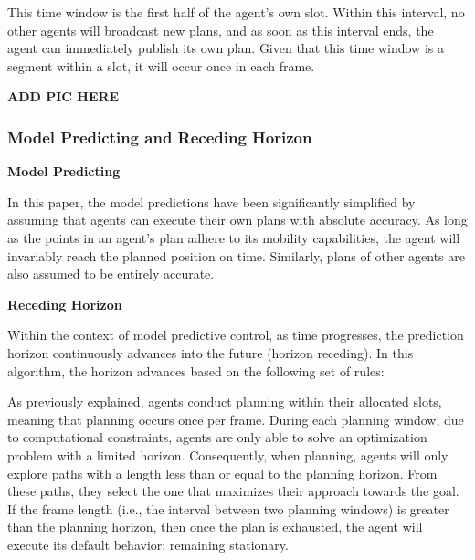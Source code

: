 This time window is the first half of the agent's own slot. Within this interval, no other agents will broadcast new plans, and as soon as this interval ends, the agent can immediately publish its own plan.
Given that this time window is a segment within a slot, it will occur once in each frame. 

\textbf{ADD PIC HERE}%

\subsubsection{Model Predicting and Receding Horizon}

\textbf{Model Predicting}

In this paper, the model predictions have been significantly simplified by assuming that agents can execute their own plans with absolute accuracy.
As long as the points in an agent's plan adhere to its mobility capabilities, the agent will invariably reach the planned position on time. Similarly, plans of other agents are also assumed to be entirely accurate.


\textbf{Receding Horizon}

Within the context of model predictive control, as time progresses, the prediction horizon continuously advances into the future (horizon receding).
In this algorithm, the horizon advances based on the following set of rules:

As previously explained, agents conduct planning within their allocated slots, meaning that planning occurs once per frame.
During each planning window, due to computational constraints, agents are only able to solve an optimization problem with a limited horizon. Consequently, when planning, agents will only explore paths with a length less than or equal to the planning horizon. From these paths, they select the one that maximizes their approach towards the goal.
If the frame length (i.e., the interval between two planning windows) is greater than the planning horizon, then once the plan is exhausted, the agent will execute its default behavior: remaining stationary.

